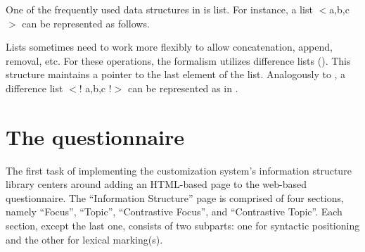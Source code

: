 

One of the frequently used data structures in  is list. For
instance, a list \ensuremath{<}a,b,c\ensuremath{>} can be represented
as follows.



\noindent Lists sometimes need to work more flexibly to allow
concatenation, append, removal, etc.  For these operations, the
 formalism utilizes difference lists ().
This structure maintains a pointer to the last element of the list.
Analogously to , a difference list \ensuremath{<}!
a,b,c !\ensuremath{>} can be represented as in .






\section{The questionnaire}
\label{11:sec:questionnaire}

The first task of implementing the customization system's information
structure library centers around adding an HTML-based page to the
web-based questionnaire.  The ``Information Structure'' page is
comprised of four sections, namely ``Focus'', ``Topic'', ``Contrastive
Focus'', and ``Contrastive Topic''. Each section, except the last one,
consists of two subparts: one for syntactic
positioning and the other for lexical marking(s).



